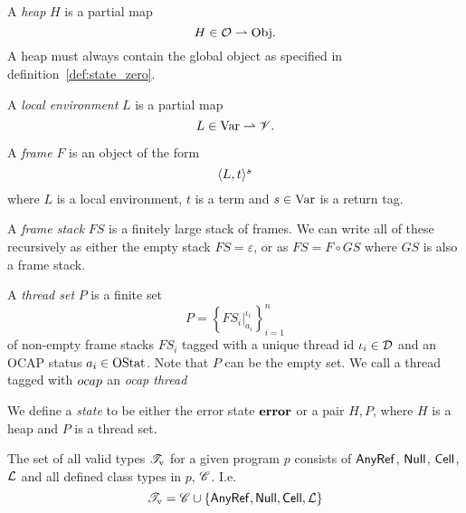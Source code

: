 \begin{definition}
  A \emph{heap} $H$ is a partial map
  \begin{equation*}
    H \in \mathcal{O} \rightharpoonup \mathrm{Obj}.
  \end{equation*}
  A heap must always contain the global object as specified in
  definition~\ref{def:state_zero}.
\end{definition}

\begin{definition}
  A \emph{local environment} $L$ is a partial map
  \begin{equation*}
    L \in \mathrm{Var} \rightharpoonup \mathscr{V}.
  \end{equation*}
\end{definition}

\begin{definition}\label{def:thread_sets}
  A \emph{frame} $F$ is an object of the form
  \begin{equation*}
    \mbox{$\langle L, t \rangle^s$}
  \end{equation*}
  where $L$ is a local environment, $t$ is a term and $s \in \mathrm{Var}$ is a
  return tag.

  A \emph{frame stack} $FS$ is a finitely large stack of frames. We can write
  all of these recursively as either the empty stack $FS = \varepsilon$, or as
  $FS = F \circ GS$ where $GS$ is also a frame stack.

  A \emph{thread set} $P$ is a finite set 
  \begin{equation*}
    P = \left\{ FS_i|_{a_i}^{\iota_i} \right\}_{i = 1}^{n}
  \end{equation*}
  of non-empty frame stacks $FS_i$ tagged with a unique thread id $\iota_i \in \mathcal{D}$ and an
  OCAP status $a_i \in \mathrm{OStat}$. Note that $P$ can be the empty set. We call
  a thread tagged with $\mbox{$ocap$}$ an \emph{ocap thread}
\end{definition}

\begin{definition}
  We define a \emph{state} to be either the error state $\mbox{{\bf error}}$ or a pair $H,
  P$, where $H$ is a heap and $P$ is a thread set.
\end{definition}

\begin{definition}
  The set of all valid types $\mathscr{T}_{\text{v}}$ for a given program $p$ consists of
  $\mbox{$\mathsf{AnyRef}$}$, $\mbox{$\mathsf{Null}$}$, $\mbox{$\mathsf{Cell}$}$, $\mbox{$\mathcal{L}$}$ and all defined
  class types in $p$, $\mathscr{C}$. I.e.
  \begin{equation*}
    \mathscr{T}_{\text{v}} = \mathscr{C} \cup \left\{ \mbox{$\mathsf{AnyRef}$}, \mbox{$\mathsf{Null}$}, \mbox{$\mathsf{Cell}$},
    \mbox{$\mathcal{L}$} \right\}
  \end{equation*}
\end{definition}

